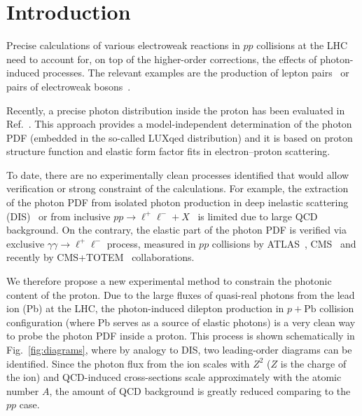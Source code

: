 \section{Introduction}

Precise calculations of various electroweak reactions in $pp$ collisions at the LHC need to account for, on top of the higher-order corrections, the effects of photon-induced processes.
The relevant examples are the production of lepton pairs~\cite{Aad:2014qja, Aad:2016zzw,Accomando:2016tah, Luszczak:2015aoa, Harland-Lang:2016apc} or pairs of electroweak bosons~\cite{Luszczak:2014mta, Denner:2015fca, Dyndal:2015hrp, Ababekri:2016kkj, Biedermann:2016guo, Biedermann:2016yvs, Yong:2016njr, Luszczak:2018ntp}.


Recently, a precise photon distribution inside the proton has been evaluated in Ref.~\cite{Manohar:2016nzj}.
This approach provides a model-independent determination of the photon PDF (embedded in the so-called LUXqed distribution)
and  it is based on proton structure function and elastic form factor fits in electron--proton scattering.

To date, there are no experimentally clean processes identified that would allow verification or strong constraint of the calculations.
For example, the extraction of the photon PDF from isolated photon production in deep inelastic scattering (DIS)~\cite{Schmidt:2015zda} 
or from inclusive $pp\rightarrow\ell^+\ell^-+X$~\cite{Ball:2013hta, Aad:2016zzw, Giuli:2017oii} is limited due to large QCD background.
On the contrary, the elastic part of the photon PDF is verified via exclusive $\gamma\gamma\rightarrow\ell^+\ell^-$ process, measured in $pp$ collisions by ATLAS~\cite{Aad:2015bwa,Aaboud:2017oiq}, CMS~\cite{Chatrchyan:2011ci,Chatrchyan:2012tv} and recently by CMS+TOTEM~\cite{Cms:2018het} collaborations.


We therefore propose a new experimental method to constrain the photonic content of the proton.
Due to the large fluxes of quasi-real photons from the lead ion (Pb) at the LHC, the photon-induced dilepton production in $p+\textrm{Pb}$ collision configuration (where Pb serves as a source of elastic photons) is a very clean way to probe the photon PDF inside a proton. 
This process is shown schematically in Fig.~\ref{fig:diagrams}, where by analogy to DIS, two leading-order diagrams can be identified.
Since the photon flux from the ion scales with $Z^2$ ($Z$ is the charge of the ion) and QCD-induced cross-sections scale approximately with the atomic number $A$,
the amount of QCD background is greatly reduced comparing to the $pp$ case.

